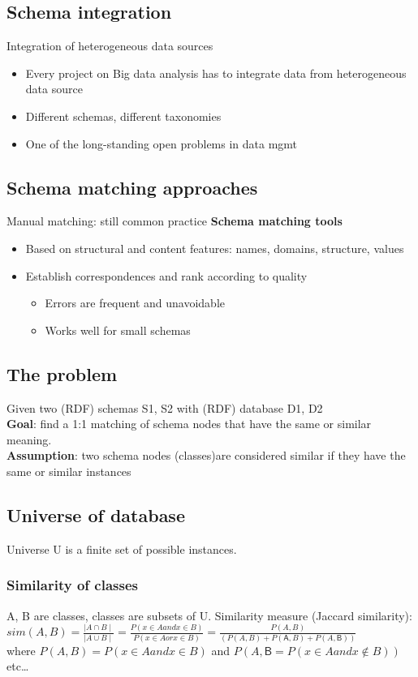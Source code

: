 \subsection{Schema integration}

Integration of heterogeneous data sources
\begin{itemize}
\item Every project on Big data analysis has to integrate data from
  heterogeneous data source
\item Different schemas, different taxonomies
\item One of the long-standing open problems in data mgmt
\end{itemize}

\subsection{Schema matching approaches}
Manual matching: still common practice
\textbf{Schema matching tools}
\begin{itemize}
\item Based on structural and content features: names, domains,
  structure, values
\item Establish correspondences and rank according to quality
  \begin{itemize}
  \item Errors are frequent and unavoidable
  \item Works well for small schemas
  \end{itemize}
\end{itemize}

\subsection{The problem}
Given two (RDF) schemas S1, S2 with (RDF) database D1, D2 \\
\textbf{Goal}: find a 1:1 matching of schema nodes that have the same
or similar meaning. \\
\textbf{Assumption}: two schema nodes (classes)are considered similar
if they have the same or similar instances

\subsection{Universe of database}
Universe U is a finite set of possible instances.
\subsubsection{Similarity of classes}
A, B are classes, classes are subsets of U.
Similarity measure (Jaccard similarity):
$ sim(A, B) = \frac{\mid A \cap B \mid}{\mid A \cup B \mid} =
\frac{P(x \in A and x \in B)}{P(x \in A or x \in B)} = \frac{P(A,
  B)}{(P(A, B) + P(\mathsf{A}, B) + P(A, \mathsf{B}))} $ \\
where $ P(A, B) = P(x \in A and x \in B) $ and $ P(A, \mathsf{B} = P(x
\in A and x \notin B)) $ etc\ldots

